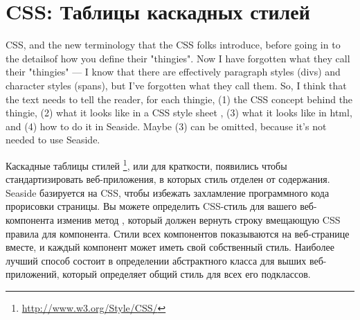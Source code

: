 \documentclass[a4paper,10pt,twoside]{book}
\begin{document}
\section{CSS: Таблицы каскадных стилей}

CSS, and the new terminology that the CSS folks introduce, before going in to the detailsof how you define their "thingies". Now I have forgotten what they call their "thingies"
--- I know that there are effectively paragraph styles (divs) and character styles
(spans), but I've forgotten what they call them. So, I think that the text needs to tell
the reader, for each thingie, (1) the CSS concept behind the thingie, (2) what it looks
like in a CSS style sheet , (3) what it looks like in html, and (4) how to do it in
Seaside. Maybe (3) can be omitted, because it's not needed to use Seaside.


Каскадные таблицы стилей \footnote{\url{http://www.w3.org/Style/CSS/}},
или  для краткости,
появились чтобы стандартизировать веб-приложения,
в которых стиль отделен от содержания.
Seaside базируется на CSS,
чтобы избежать захламление программного кода прорисовки страницы.
Вы можете определить CSS-стиль для вашего веб-компонента изменив метод
, который должен вернуть строку вмещающую CSS правила
для компонента.
Стили всех компонентов показываются на веб-странице вместе,
и каждый компонент может иметь свой собственный стиль.
Наиболее лучший способ состоит в определении абстрактного класса
для выших веб-приложений,
который определяет общий стиль для всех его подклассов.

\end{document}
